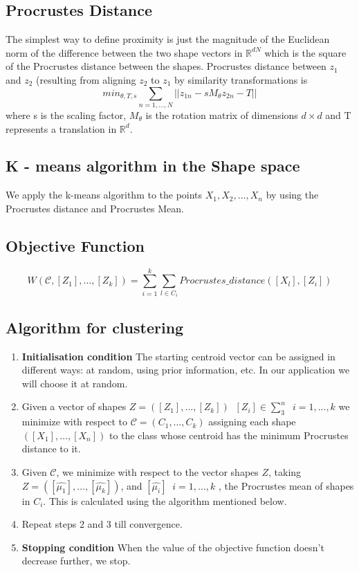 \documentclass{article}
\begin{document}
\subsection{Procrustes Distance}
The simplest way to define proximity is just the magnitude of the Euclidean norm of the difference between the two shape vectors in $\mathbb{R}^{dN}$ which is the square of the Procrustes distance between the shapes.
Procrustes distance between $z_{1}$ and $z_{2}$ (resulting from aligning $z_{2}$ to $z_{1}$ by similarity transformations is 
$$min_{\theta,T,s} \sum_{n = 1,...,N} || z_{1n} - s M_{\theta} z_{2n} - T ||$$
where s is the scaling factor, $M_{\theta}$ is the rotation matrix of dimensions $d \times d$ and T represents a translation in $\mathbb{R}^{d}$.
\subsection{K - means algorithm in the Shape space}
We apply the k-means algorithm to the points $X_{1}, X_{2}, \dots,X_{n}$ by using the Procrustes distance and Procrustes Mean.

\subsection{Objective Function}
$$W(\mathcal{C},[Z_{1}], \dots, [Z_{k} ]) = \sum_{i=1}^{k} \sum_{l \in C_{i}} Procrustes\_distance([X_{l}],[Z_{i}])$$
\subsection{Algorithm for clustering}
\begin{enumerate}
    \item \textbf{Initialisation condition} The starting centroid vector can be assigned in different ways: at random, using prior information,
    etc. In our application we will choose it at random.
    \item Given a vector of shapes $Z = ([Z_{1}], \dots, [Z_{k} ]) \; \; [Z_{i}] \in \sum_{3}^{n} \; \; i = 1, . . . , k$ we minimize
    with respect to $\mathcal{C} = (C_{1},\dots, C_{k} ) $ assigning each shape
    $([X_{1}],\dots, [X_{n}])$ to the class whose centroid has the minimum Procrustes distance to it.
    \item Given $\mathcal{C}$, we minimize with respect to the vector shapes $Z$, taking $Z = ([\hat{\mu_{1}}],\dots, [\hat{\mu_{k}}])$,
    and $[\hat{\mu_{i}}] \;\; i = 1, . . . , k$ , the Procrustes mean of shapes in $C_{i}$. This is calculated using the algorithm mentioned below.
    \item Repeat steps 2 and 3 till convergence.
    \item \textbf{Stopping condition} When the value of the objective function doesn't decrease further, we stop.
\end{enumerate}
\end{document}
